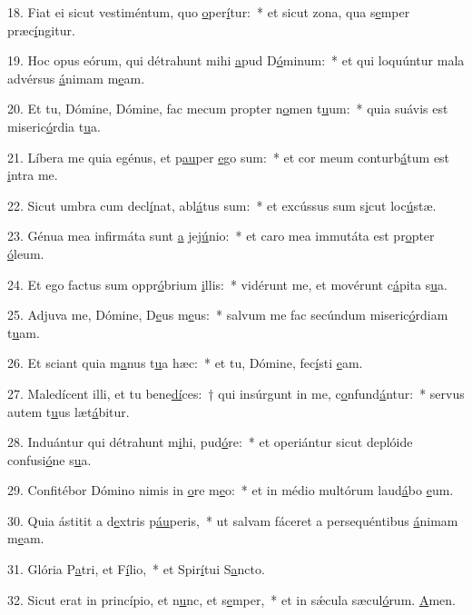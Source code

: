18. Fiat ei sicut vestiméntum, quo \uline{o}per\uline{í}tur:~* et sicut zona, qua s\uline{e}mper præc\uline{í}ngitur.\par 
19. Hoc opus eórum, qui détrahunt mihi \uline{a}pud D\uline{ó}minum:~* et qui loquúntur mala advérsus \uline{á}nimam m\uline{e}am.\par 
20. Et tu, Dómine, Dómine, fac mecum propter n\uline{o}men t\uline{u}um:~* quia suávis est miseric\uline{ó}rdia t\uline{u}a.\par 
21. Líbera me quia egénus, et p\uline{au}per \uline{e}go sum:~* et cor meum conturb\uline{á}tum est \uline{i}ntra me.\par 
22. Sicut umbra cum decl\uline{í}nat, abl\uline{á}tus sum:~* et excússus sum s\uline{i}cut loc\uline{ú}stæ.\par 
23. Génua mea infirmáta sunt \uline{a} jej\uline{ú}nio:~* et caro mea immutáta est pr\uline{o}pter \uline{ó}leum.\par 
24. Et ego factus sum oppr\uline{ó}brium \uline{i}llis:~* vidérunt me, et movérunt c\uline{á}pita s\uline{u}a.\par 
25. Adjuva me, Dómine, D\uline{e}us m\uline{e}us:~* salvum me fac secúndum miseric\uline{ó}rdiam t\uline{u}am.\par 
26. Et sciant quia m\uline{a}nus t\uline{u}a hæc:~* et tu, Dómine, fec\uline{í}sti \uline{e}am.\par 
27. Maledícent illi, et tu bene\uline{dí}ces:~† qui insúrgunt in me, c\uline{o}nfund\uline{á}ntur:~* servus autem t\uline{u}us læt\uline{á}bitur.\par 
28. Induántur qui détrahunt m\uline{i}hi, pud\uline{ó}re:~* et operiántur sicut deplóide confusi\uline{ó}ne s\uline{u}a.\par 
29. Confitébor Dómino nimis in \uline{o}re m\uline{e}o:~* et in médio multórum laud\uline{á}bo \uline{e}um.\par 
30. Quia ástitit a d\uline{e}xtris p\uline{áu}peris,~* ut salvam fáceret a persequéntibus \uline{á}nimam m\uline{e}am.\par 
31. Glória P\uline{a}tri, et F\uline{í}lio,~* et Spir\uline{í}tui S\uline{a}ncto.\par 
32. Sicut erat in princípio, et n\uline{u}nc, et s\uline{e}mper,~* et in sǽcula sæcul\uline{ó}rum. \uline{A}men.\par 
